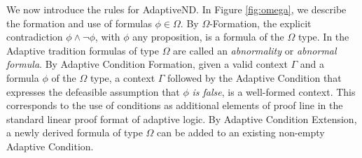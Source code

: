 \documentclass[]{article}
\begin{document}



We now introduce the rules for {\sf AdaptiveND}. In Figure \ref{fig:omega}, we describe the formation and use of formulas $\phi \in \Omega$. By $\Omega${\sf-Formation}, the explicit contradiction $\phi \wedge \neg \phi$, with $\phi$ any proposition, is a formula of the $\Omega$ type. In the Adaptive tradition formulas of type $\Omega$ are called an \textit{abnormality} or \textit{abnormal formula}. By {\sf Adaptive Condition Formation}, given a valid context $\Gamma$ and a formula $\phi$ of the $\Omega$ type, a context $\Gamma$ followed by the Adaptive Condition that expresses the defeasible assumption that $\phi$ \textit{is false}, is a well-formed context. This corresponds to the use of conditions as additional elements of proof line in the standard linear proof format of adaptive logic. By {\sf Adaptive Condition Extension}, a newly derived formula of type $\Omega$ can be added to an existing non-empty Adaptive Condition.
\end{document}
